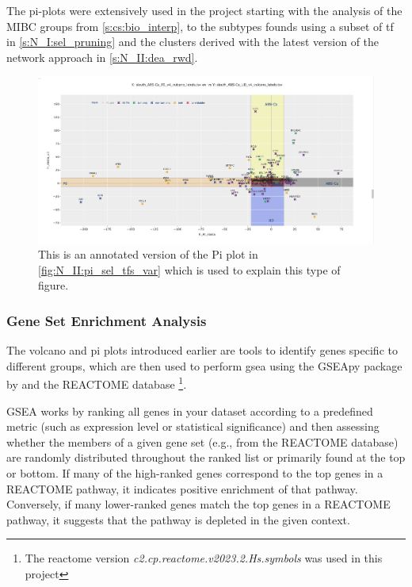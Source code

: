 The pi-plots were extensively used in the project starting with the analysis of the MIBC groups from \cref{s:cs:bio_interp}, to the subtypes founds using a subset of \acrlong{tf} in \cref{s:N_I:sel_pruning} and the clusters derived with the latest version of the network approach in \cref{s:N_II:dea_rwd}.

\begin{figure}[!htb]    
    \centering
    \includegraphics[width=1.0\textwidth,height=1.0\textheight,keepaspectratio]{Sections/Network_I/Resources/selective_pruning/sel_tfs_pi_all_var_rect.png}
    \caption{This is an annotated version of the Pi plot in \cref{fig:N_II:pi_sel_tfs_var} which is used to explain this type of figure.}
    \label{fig:lit:pi_eg}
\end{figure}

\subsubsection{Gene Set Enrichment Analysis} \label{s:lit:gsea}

The volcano and pi plots introduced earlier are tools to identify genes specific to different groups, which are then used to perform \acrfull{gsea} using the GSEApy package by \citet{Fang2023-ec} and the REACTOME database\cite{Milacic2024-yt} \footnote{The reactome version \textit{c2.cp.reactome.v2023.2.Hs.symbols }was used in this project}.

GSEA works by ranking all genes in your dataset according to a predefined metric (such as expression level or statistical significance) and then assessing whether the members of a given gene set (e.g., from the REACTOME database) are randomly distributed throughout the ranked list or primarily found at the top or bottom. If many of the high-ranked genes correspond to the top genes in a REACTOME pathway, it indicates positive enrichment of that pathway. Conversely, if many lower-ranked genes match the top genes in a REACTOME pathway, it suggests that the pathway is depleted in the given context.

